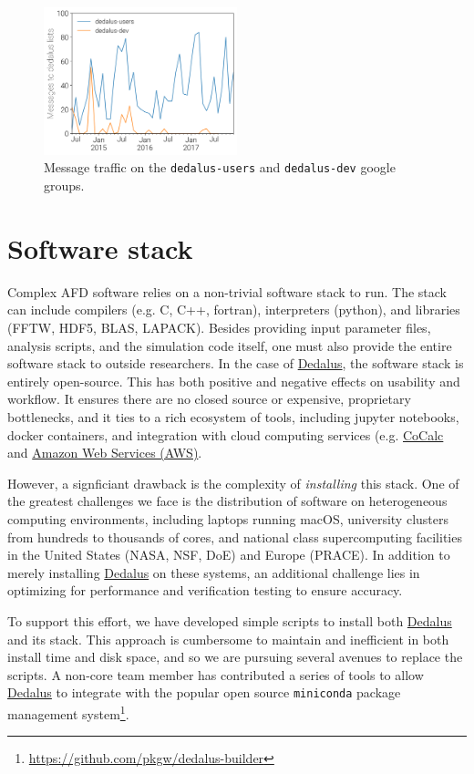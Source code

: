 \documentclass[12pt, titlepage]{aastex62}
\newcommand{\dedalus}{\href{http://dedalus-project.org}{Dedalus}}
\begin{document}
\begin{figure}
  \centering
  \includegraphics[width=0.5\textwidth]{../figs/message_counts.png}
  \caption{Message traffic on the \texttt{dedalus-users} and \texttt{dedalus-dev} google groups.}
  \label{fig:messages}
\end{figure}

\section{Software stack}
\label{sec:stack}

Complex AFD software relies on a non-trivial software stack to run. The stack can include compilers (e.g. C, C++, fortran), interpreters (python), and libraries (FFTW, HDF5, BLAS, LAPACK). Besides providing input parameter files, analysis scripts, and the simulation code itself, one must also provide the entire software stack to outside researchers. In the case of \dedalus{}, the software stack is entirely open-source. This has both positive and negative effects on usability and workflow. It ensures there are no closed source or expensive, proprietary bottlenecks, and it ties to a rich ecosystem of tools, including jupyter notebooks, docker containers, and integration with cloud computing services (e.g. \href{http://cocalc.com}{CoCalc} and \href{https://aws.amazon.com}{Amazon Web Services (AWS)}. 

However, a signficiant drawback is the complexity of \emph{installing} this stack. One of the greatest challenges we face is the distribution of software on heterogeneous computing environments, including laptops running macOS, university clusters from hundreds to thousands of cores, and national class supercomputing facilities in the United States (NASA, NSF, DoE) and Europe (PRACE). In addition to merely installing \dedalus{} on these systems, an additional challenge lies in optimizing for performance and verification testing to ensure accuracy. 

To support this effort, we have developed simple scripts to install both \dedalus{} and its stack. This approach is cumbersome to maintain and inefficient in both install time and disk space, and so we are pursuing several avenues to replace the scripts. A non-core team member has contributed a series of tools to allow \dedalus{} to integrate with the popular open source \texttt{miniconda} package management system\footnote{\url{https://github.com/pkgw/dedalus-builder}}.
\end{document}
